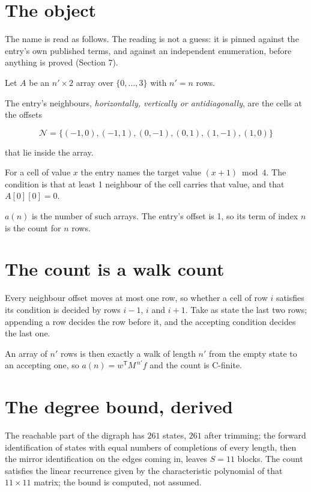 \documentclass[11pt]{article}
\theoremstyle{definition}
\begin{document}
\section{The object}

The name is read as follows. The reading is not a guess: it is pinned against the entry's own published terms, and against an independent enumeration, before anything is proved (Section 7).

Let $A$ be an $n' \times 2$ array over $\{0,\dots,3\}$ with $n' = n$ rows.

The entry's neighbours, {\itshape horizontally, vertically or antidiagonally}, are the cells at the offsets

\[\mathcal{N} = \{(-1,0), (-1,1), (0,-1), (0,1), (1,-1), (1,0)\}\]

that lie inside the array.

For a cell of value $x$ the entry names the target value $(x + 1) \bmod 4$. The condition is that at least 1 neighbour of the cell carries that value, and that $A[0][0] = 0$.

$a(n)$ is the number of such arrays. The entry's offset is 1, so its term of index $n$ is the count for $n$ rows.

\section{The count is a walk count}

Every neighbour offset moves at most one row, so whether a cell of row $i$ satisfies its condition is decided by rows $i-1$, $i$ and $i+1$. Take as state the last two rows; appending a row decides the row before it, and the accepting condition decides the last one.

An array of $n'$ rows is then exactly a walk of length $n'$ from the empty state to an accepting one, so $a(n) = w^{\mathsf T}M^{\,n'}f$ and the count is C-finite.

\section{The degree bound, derived}

The reachable part of the digraph has $261$ states, $261$ after trimming; the forward identification of states with equal numbers of completions of every length, then the mirror identification on the edges coming in, leaves $S = 11$ blocks. The count satisfies the linear recurrence given by the characteristic polynomial of that $11\times11$ matrix; the bound is computed, not assumed.
\end{document}
